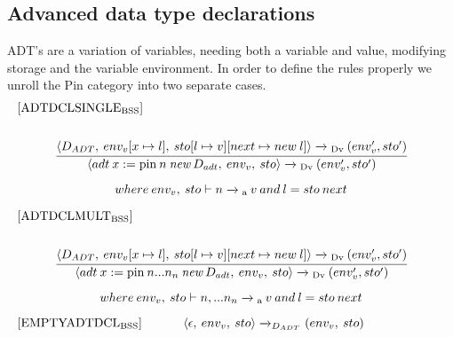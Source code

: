 \subsection*{Advanced data type declarations}
ADT's are a variation of variables, needing both a variable and value, modifying storage and the variable environment. In order to define the rules properly we unroll the Pin category into two separate cases.
\begin{equation}
\begin{split}
\begin{minipage}{\linewidth}
$[\text{ADTDCLSINGLE}_\text{BSS}]$
\end{minipage}
\\\\
\begin{minipage}{\linewidth}
\centering
$\cfrac{\langle D_{ADT}, \: env_v [x \mapsto l], \: sto[l \mapsto v][next \mapsto new \: l]\rangle \xrightarrow{}\textsubscript{Dv} \: (env_v', sto') }{\langle adt \: x:= \text{pin} \: n \: \textit{new} \: D_{adt}, \: env_v, \: sto \rangle \xrightarrow{}\textsubscript{Dv} \: (env_v', sto')}$
\[where \: env_v, \: sto \vdash n \xrightarrow{}\textsubscript{a} \: v \: and \: l = sto \: next\]
\end{minipage}
\end{split}
\end{equation}

\begin{equation}
\begin{split}
\begin{minipage}{\linewidth}
$[\text{ADTDCLMULT}_\text{BSS}]$
\end{minipage}
\\\\
\begin{minipage}{\linewidth}
\centering
$\cfrac{\langle D_{ADT}, \: env_v [x \mapsto l], \: sto[l \mapsto v][next \mapsto new \: l]\rangle \xrightarrow{}\textsubscript{Dv} \: (env_v', sto') }{\langle adt \: x:= \text{pin} \: n...n_n \: \textit{new} \: D_{adt}, \: env_v, \: sto \rangle \xrightarrow{}\textsubscript{Dv} \: (env_v', sto')}$
\[where \: env_v, \: sto \vdash n, ... n_n \xrightarrow{}\textsubscript{a} \: v \: and \: l = sto \: next\]
\end{minipage}
\end{split}
\end{equation}



\begin{equation}
\begin{minipage}{.2\linewidth}
$[\text{EMPTYADTDCL}_\text{BSS}]$
\end{minipage}
\begin{minipage}{.8\linewidth}
\centering
$\langle \epsilon, \: env_v, \: sto \rangle \xrightarrow{}_{D_{ADT}}$ $(env_v, \: sto)$
\end{minipage}
\end{equation}


